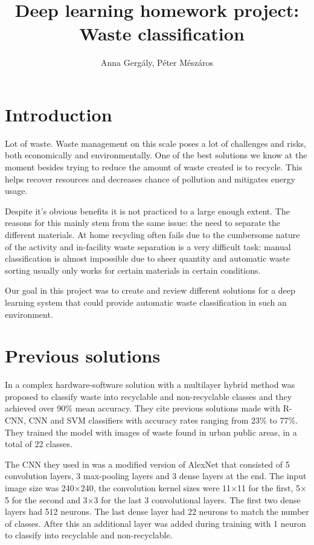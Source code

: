 \documentclass[twocolumn]{article}
\begin{document}
	\title{Deep learning homework project: \ Waste classification}
	\author{Anna Gergály, Péter Mészáros}
	\maketitle
	
	\section{Introduction}
	Lot of waste. Waste management on this scale poses a lot of challenges and risks, both economically and environmentally. One of the best solutions we know at the moment besides trying to reduce the amount of waste created is to recycle. This helps recover resources and decreases chance of pollution and mitigates energy usage. 
	
	Despite it's obvious benefits it is not practiced to a large enough extent. The reasons for this mainly stem from the same issue: the need to separate the different materials. At home recycling often fails due to the cumbersome nature of the activity and in-facility waste separation is a very difficult task: manual classification is almost impossible due to sheer quantity and automatic waste sorting usually only works for certain materials in certain conditions.
	
	Our goal in this project was to create and review different solutions for a deep learning system that could provide automatic waste classification in such an environment.
	
	\section{Previous solutions}\label{sec:prevsolutions}
	In \cite{Chu2018} a complex hardware-software solution with a multilayer hybrid method was proposed to classify waste into recyclable and non-recyclable classes and they achieved over 90\% mean accuracy. They cite previous solutions made with R-CNN, CNN and SVM classifiers with accuracy rates ranging from 23\% to 77\%. They trained the model with images of waste found in urban public areas, in a total of 22 classes.
	
	The CNN they used in \cite{Chu2018} was a modified version of AlexNet \cite{AlexNet} that consisted of 5 convolution layers, 3 max-pooling layers and 3 dense layers at the end. The input image size was 240$\times$240, the convolution kernel sizes were 11$\times$11 for the first, 5$\times$5 for the second and 3$\times$3 for the last 3 convolutional layers. The first two dense layers had 512 neurons. The last dense layer had 22 neurons to match the number of classes. After this an additional layer was added during training with 1 neuron to classify into recyclable and non-recyclable.
	
\end{document}
